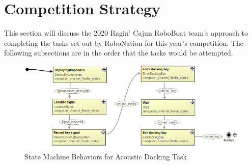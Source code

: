 \documentclass[letterpaper, 12 pt, conference]{ieeeconf}
\begin{document}
\section{Competition Strategy}
This section will discuss the 2020 Ragin' Cajun RoboBoat team's approach to completing the tasks set out by RoboNation for this year's competition. The following subsections are in the order that the tasks would be attempted.
%
\begin{figure}[t]
\centering
\vspace{0.05in}
\includegraphics[width=2\columnwidth]{Figures/Acoustic_docking_FSM.png}
\caption{State Machine Behaviors for Acoustic Docking Task}
\label{fig:AcousticDocking}
\end{figure}
%
\end{document}
